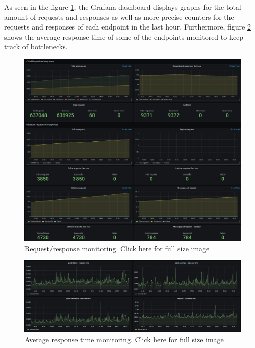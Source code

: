 As seen in the figure \ref{fig:Monitoring1}, the Grafana dashboard displays graphs for the total amount of requests and responses as well as more precise counters for the requests and responses of each endpoint in the last hour. Furthermore, figure \ref{fig:Monitoring2} shows the average response time of some of the endpoints monitored to keep track of bottlenecks.

\begin{figure}[H]
    \centering
    \includegraphics[width=1\textwidth]{report/images/MonitoringRequest.png}
    \caption{Request/response monitoring. \href{https://github.com/Niels-Frederik/MiniTwit/blob/main/report/images/MonitoringRequest.png}{Click here for full size image}}
    \label{fig:Monitoring1}
\end{figure}

\begin{figure}[H]
    \centering
    \includegraphics[width=1\textwidth]{report/images/grafana-response-times.png}
    \caption{Average response time monitoring. \href{https://github.com/Niels-Frederik/MiniTwit/blob/main/report/images/MonitoringRequest.png}{Click here for full size image}}
    \label{fig:Monitoring2}
\end{figure}


